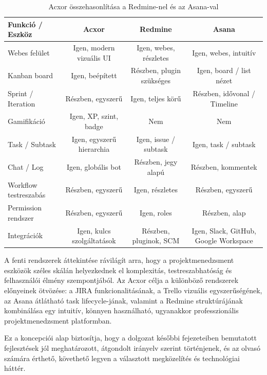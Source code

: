\begin{table}[h!]
\centering
\scriptsize
\begin{tabular}{|l|c|c|c|}
\hline
\textbf{Funkció / Eszköz} & \textbf{Acxor} & \textbf{Redmine} & \textbf{Asana} \\
\hline
Webes felület & Igen, modern vizuális UI & Igen, webes, részletes & Igen, webes, intuitív \\
Kanban board & Igen, beépített & Részben, plugin szükséges & Igen, board / list nézet \\
Sprint / Iteration & Részben, egyszerű & Igen, teljes körű & Részben, idővonal / Timeline \\
Gamifikáció & Igen, XP, szint, badge & Nem & Nem \\
Task / Subtask & Igen, egyszerű hierarchia & Igen, issue / subtask & Igen, task / subtask \\
Chat / Log & Igen, globális bot & Részben, jegy alapú & Részben, kommentek \\
Workflow testreszabás & Részben, egyszerű & Igen, részletes & Részben, egyszerű \\
Permission rendszer & Részben, egyszerű & Igen, roles & Részben, alap \\
Integrációk & Igen, kulcs szolgáltatások & Részben, pluginok, SCM & Igen, Slack, GitHub, Google Workspace \\
\hline
\end{tabular}
\caption{Acxor összehasonlítása a Redmine-nel és az Asana-val}
\end{table}




A fenti rendszerek áttekintése rávilágít arra, hogy a projektmenedzsment eszközök széles skálán helyezkednek el komplexitás, testreszabhatóság és felhasználói élmény szempontjából. Az Acxor célja a különböző rendszerek előnyeinek ötvözése: a JIRA funkcionalitásának, a Trello vizuális egyszerűségének, az Asana átlátható task lifecycle-jának, valamint a Redmine struktúrájának kombinálása egy intuitív, könnyen használható, ugyanakkor professzionális projektmenedzsment platformban.

Ez a koncepciói alap biztosítja, hogy a dolgozat későbbi fejezeteiben bemutatott fejlesztések jól meghatározott, átgondolt irányelv szerint történjenek, és az olvasó számára érthető, követhető legyen a választott megközelítés és technológiai háttér.

